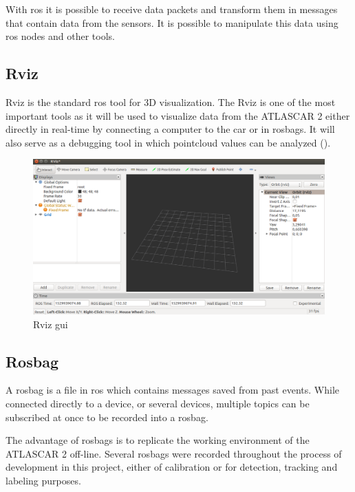 With \gls{ros} it is possible to receive data packets and transform them in messages that contain data from the sensors. It is possible to manipulate this data using \gls{ros} nodes and other tools. 

\subsection{Rviz}
Rviz is the standard \gls{ros} tool for 3D visualization. The Rviz is one of the most important tools as it will be used to visualize data from the ATLASCAR 2 either directly in real-time by connecting a computer to the car or in rosbags. It will also serve as a debugging tool in which pointcloud values can be analyzed (\cite{ROSWiki}).

\begin{figure}[htp]
	
	\centering
	\includegraphics[width=.99\textwidth]{capexp/imgs/rviz.png}
	
	\caption{Rviz \gls{gui}}
	\label{fig:rviz}
	
\end{figure}

\subsection{Rosbag}

A rosbag is a file in \gls{ros} which contains messages saved from past events. While connected directly to a device, or several devices, multiple topics can be subscribed at once to be recorded into a rosbag. 

The advantage of rosbags is to replicate the working environment of the ATLASCAR 2 off-line. Several rosbags were recorded throughout the process of development in this project, either of calibration or for detection, tracking and labeling purposes. 

